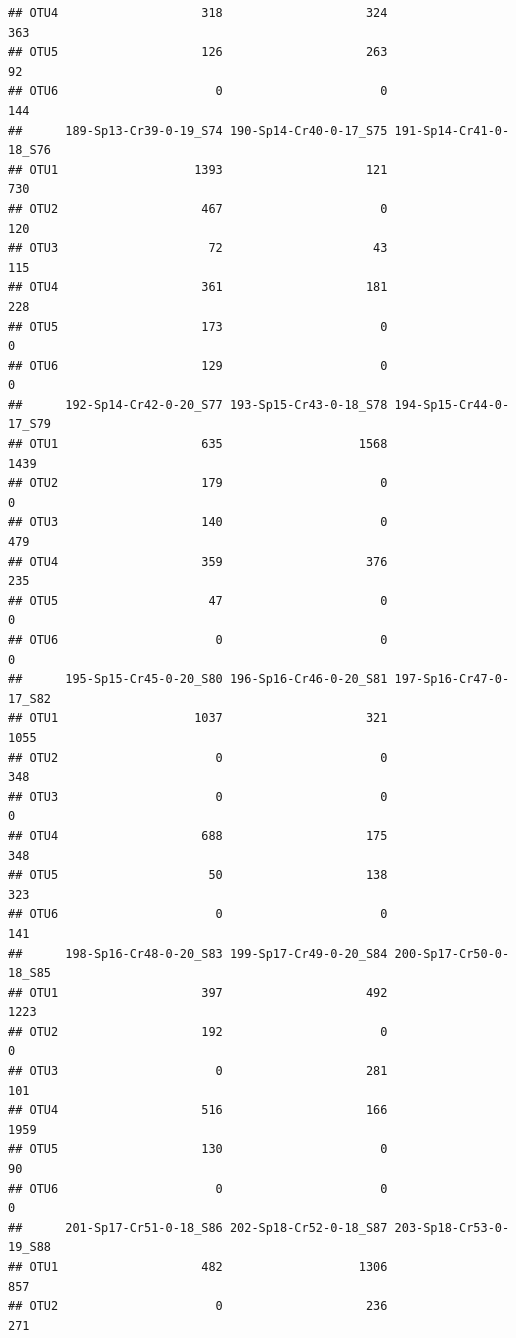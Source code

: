 \documentclass[]{article}
\begin{document}
\begin{verbatim}
## OTU4                    318                    324                    363
## OTU5                    126                    263                     92
## OTU6                      0                      0                    144
##      189-Sp13-Cr39-0-19_S74 190-Sp14-Cr40-0-17_S75 191-Sp14-Cr41-0-18_S76
## OTU1                   1393                    121                    730
## OTU2                    467                      0                    120
## OTU3                     72                     43                    115
## OTU4                    361                    181                    228
## OTU5                    173                      0                      0
## OTU6                    129                      0                      0
##      192-Sp14-Cr42-0-20_S77 193-Sp15-Cr43-0-18_S78 194-Sp15-Cr44-0-17_S79
## OTU1                    635                   1568                   1439
## OTU2                    179                      0                      0
## OTU3                    140                      0                    479
## OTU4                    359                    376                    235
## OTU5                     47                      0                      0
## OTU6                      0                      0                      0
##      195-Sp15-Cr45-0-20_S80 196-Sp16-Cr46-0-20_S81 197-Sp16-Cr47-0-17_S82
## OTU1                   1037                    321                   1055
## OTU2                      0                      0                    348
## OTU3                      0                      0                      0
## OTU4                    688                    175                    348
## OTU5                     50                    138                    323
## OTU6                      0                      0                    141
##      198-Sp16-Cr48-0-20_S83 199-Sp17-Cr49-0-20_S84 200-Sp17-Cr50-0-18_S85
## OTU1                    397                    492                   1223
## OTU2                    192                      0                      0
## OTU3                      0                    281                    101
## OTU4                    516                    166                   1959
## OTU5                    130                      0                     90
## OTU6                      0                      0                      0
##      201-Sp17-Cr51-0-18_S86 202-Sp18-Cr52-0-18_S87 203-Sp18-Cr53-0-19_S88
## OTU1                    482                   1306                    857
## OTU2                      0                    236                    271

\end{verbatim}
\end{document}
